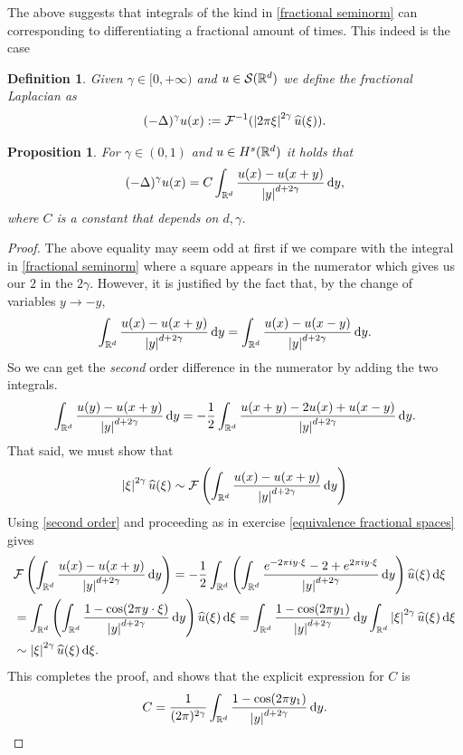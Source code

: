 \documentclass[12pt]{article}
\newtheorem{proposition}[theorem]{Proposition}
\newtheorem{definition}[theorem]{Definition}
\theoremstyle{definition}
\renewcommand{\d}{\,\mathrm{d}}
\begin{document}
The above suggests that integrals of the kind in \eqref{fractional seminorm} can corresponding to differentiating a fractional amount of times. This indeed is the case
\begin{definition}
	Given $\gamma  \in [0,+\infty)$ and $u \in \mathcal{S} (\mathbb{R}^d)$ we define the fractional Laplacian as
	\begin{align*}
		(-\Delta )^{\gamma }u(x):= \mathcal{F}^{-1}(\left| 2\pi\xi \right|^{2\gamma }\widehat{u}(\xi )).
	\end{align*}
\end{definition}
\begin{proposition}
	For $\gamma  \in (0,1)$ and $u \in H^s(\mathbb{R}^d)$ it holds that
	\begin{align*}
		(-\Delta )^{\gamma }u(x)=C\int_{\R^d}\frac{u(x)-u(x+y)}{\abs{y}^{d+2\gamma}}\d y,
	\end{align*}
	where $C$ is a constant that depends on $d,\gamma $.
\end{proposition}
\begin{proof}
	The above equality may seem odd at first if we compare with the integral in \eqref{fractional seminorm} where a square appears in the numerator which gives us our $2$  in the $2 \gamma $. However, it is justified by the fact that, by the change of variables $y \to -y$,
	\begin{align*}
		\int_{\R^d}\frac{u(x)-u(x+y)}{\abs{y}^{d+2\gamma}}\d y=\int_{\R^d}\frac{u(x)-u(x-y)}{\abs{y}^{d+2\gamma}}\d y.
	\end{align*}
	So we can get the \emph{second} order difference in the numerator by adding the two integrals.
	\begin{align}\label{second order}
		\int_{\R^d}\frac{u(y)-u(x+y)}{\abs{y}^{d+2\gamma}}\d y=-\frac{1}{2}\int_{\R^d}\frac{u(x+y)-2u(x)+u(x-y)}{\abs{y}^{d+2\gamma}}\d y.
	\end{align}
	That said, we must show that
	\begin{align*}
		\abs{\xi}^{2\gamma }\wh{u}(\xi )\sim \Ff \left(\int_{\R^d}\frac{u(x)-u(x+y)}{\abs{y}^{d+2\gamma}}\d y\right)
	\end{align*}
	Using \eqref{second order} and proceeding as in exercise \ref{equivalence fractional spaces} gives
	\begin{align*}
		 & \Ff \left(\int_{\R^d}\frac{u(x)-u(x+y)}{\abs{y}^{d+2\gamma}}\d y\right)= -\frac{1}{2} \int_{\R^d}\left(\int_{\R^d}\frac{e^{-2\pi i y \cdot \xi}-2+e^{2\pi i y \cdot \xi}}{\abs{y}^{d+2\gamma}}\d y\right) \wh{u}(\xi)\d \xi       \\
		 & =\int_{\R^d}\left(\int_{\R^d}\frac{1-\cos(2\pi y \cdot \xi)}{\abs{y}^{d+2\gamma}}\d y\right) \wh{u}(\xi)\d \xi =\int_{\R^d}  \frac{1-\cos(2\pi  y_1) }{\abs{y}^{d+2\gamma	}}\d y\int_{\R^d}\abs{\xi}^{2 \gamma }\wh{u}(\xi)\d \xi \\& \sim \abs{\xi}^{2 \gamma }\wh{u}(\xi)\d \xi.
	\end{align*}
	This completes the proof, and shows that the explicit expression for $C$ is
	\begin{align*}
		C=\frac{1}{(2\pi)^{2 \gamma }}\int_{\R^d}  \frac{1-\cos(2\pi  y_1) }{\abs{y}^{d+2\gamma	}}\d y.
	\end{align*}
\end{proof}
\end{document}
